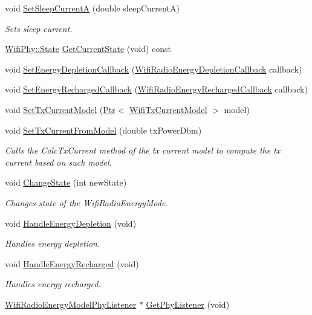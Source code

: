 \begin{DoxyCompactItemize}
void \hyperlink{classns3_1_1WifiRadioEnergyModel_ac8f0d94b09aaca5d263418f0d12999d2}{Set\+Sleep\+CurrentA} (double sleep\+CurrentA)
\begin{DoxyCompactList}\small\item\em Sets sleep current. \end{DoxyCompactList}\item 
\hyperlink{classns3_1_1WifiPhy_af97408fa76f99797497b492758467143}{Wifi\+Phy\+::\+State} \hyperlink{classns3_1_1WifiRadioEnergyModel_a5e91c27bd230de0d77ce2d92d6466c63}{Get\+Current\+State} (void) const 
\item 
void \hyperlink{classns3_1_1WifiRadioEnergyModel_ac63b5a776a5d8e2970a601a86e657dfb}{Set\+Energy\+Depletion\+Callback} (\hyperlink{classns3_1_1WifiRadioEnergyModel_afdab2f5c9b565fd1ef7cf3fddd62ffab}{Wifi\+Radio\+Energy\+Depletion\+Callback} callback)
\item 
void \hyperlink{classns3_1_1WifiRadioEnergyModel_afb624b14b1d5c1dbc3c6e7469e07d3ad}{Set\+Energy\+Recharged\+Callback} (\hyperlink{classns3_1_1WifiRadioEnergyModel_a1b594cba69350dd9bb93fc525f6124c4}{Wifi\+Radio\+Energy\+Recharged\+Callback} callback)
\item 
void \hyperlink{classns3_1_1WifiRadioEnergyModel_a94facd270dd3830375f82e1252429c22}{Set\+Tx\+Current\+Model} (\hyperlink{classns3_1_1Ptr}{Ptr}$<$ \hyperlink{classns3_1_1WifiTxCurrentModel}{Wifi\+Tx\+Current\+Model} $>$ model)
\item 
void \hyperlink{classns3_1_1WifiRadioEnergyModel_ac4a5fadb7f13e80b744382552d937611}{Set\+Tx\+Current\+From\+Model} (double tx\+Power\+Dbm)
\begin{DoxyCompactList}\small\item\em Calls the Calc\+Tx\+Current method of the tx current model to compute the tx current based on such model. \end{DoxyCompactList}\item 
void \hyperlink{classns3_1_1WifiRadioEnergyModel_a329d64a275e2e09c49c7752528d68033}{Change\+State} (int new\+State)
\begin{DoxyCompactList}\small\item\em Changes state of the Wifi\+Radio\+Energy\+Mode. \end{DoxyCompactList}\item 
void \hyperlink{classns3_1_1WifiRadioEnergyModel_a599225366342af93f109bb4ef74269ac}{Handle\+Energy\+Depletion} (void)
\begin{DoxyCompactList}\small\item\em Handles energy depletion. \end{DoxyCompactList}\item 
void \hyperlink{classns3_1_1WifiRadioEnergyModel_a196c41c7ee7f52c456a18272ec6227c5}{Handle\+Energy\+Recharged} (void)
\begin{DoxyCompactList}\small\item\em Handles energy recharged. \end{DoxyCompactList}\item 
\hyperlink{classns3_1_1WifiRadioEnergyModelPhyListener}{Wifi\+Radio\+Energy\+Model\+Phy\+Listener} $\ast$ \hyperlink{classns3_1_1WifiRadioEnergyModel_a3d01e23720d210ec88799079f6aaa951}{Get\+Phy\+Listener} (void)
\end{DoxyCompactItemize}
